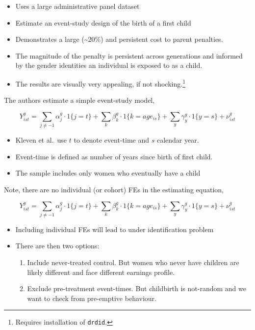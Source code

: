 \documentclass[
  letterpaper,
  DIV=11,
  numbers=noendperiod]{scrreprt}
\providecommand{\tightlist}{%
  \setlength{\itemsep}{0pt}\setlength{\parskip}{0pt}}\usepackage{longtable,booktabs,array}
\theoremstyle{definition}
\theoremstyle{remark}
\begin{document}
\begin{itemize}
\tightlist
\item
  Uses a large administrative panel dataset
\item
  Estimate an event-study design of the birth of a first child
\item
  Demonstrates a large (\textasciitilde20\%) and persistent cost to
  parent penalties.
\item
  The magnitude of the penalty is persistent across generations and
  informed by the gender identities an individual is exposed to as a
  child.
\item
  The results are visually very appealing, if not shocking.\footnote{Requires
    installation of \texttt{drdid}.}
\end{itemize}

The authors estimate a simple event-study model,

\[
Y^g_{ist} = \sum_{j\neq-1}\alpha^g_j\cdot1\{j=t\}+\sum_{k}\beta^g_k\cdot1\{k=age_{is}\}+\sum_y\gamma^g_y\cdot1\{y=s\}+\nu^g_{ist}
\]

\begin{itemize}
\tightlist
\item
  Kleven et al.~use \(t\) to denote event-time and \(s\) calendar year.
\item
  Event-time is defined as number of years since birth of first child.
\item
  The sample includes only women who eventually have a child
\end{itemize}

Note, there are no individual (or cohort) FEs in the estimating
equation,

\[
Y^g_{ist} = \sum_{j\neq-1}\alpha^g_j\cdot1\{j=t\}+\sum_{k}\beta^g_k\cdot1\{k=age_{is}\}+\sum_y\gamma^g_y\cdot1\{y=s\}+\nu^g_{ist}
\]

\begin{itemize}
\tightlist
\item
  Including individual FEs will lead to under identification problem
\item
  There are then two options:

  \begin{enumerate}
  \def\labelenumi{\arabic{enumi}.}
  \tightlist
  \item
    Include never-treated control. But women who never have children are
    likely different and face different earnings profile.
  \item
    Exclude pre-treatment event-times. But childbirth is not-random and
    we want to check from pre-emptive behaviour.
  \end{enumerate}
\end{itemize}
\end{document}
